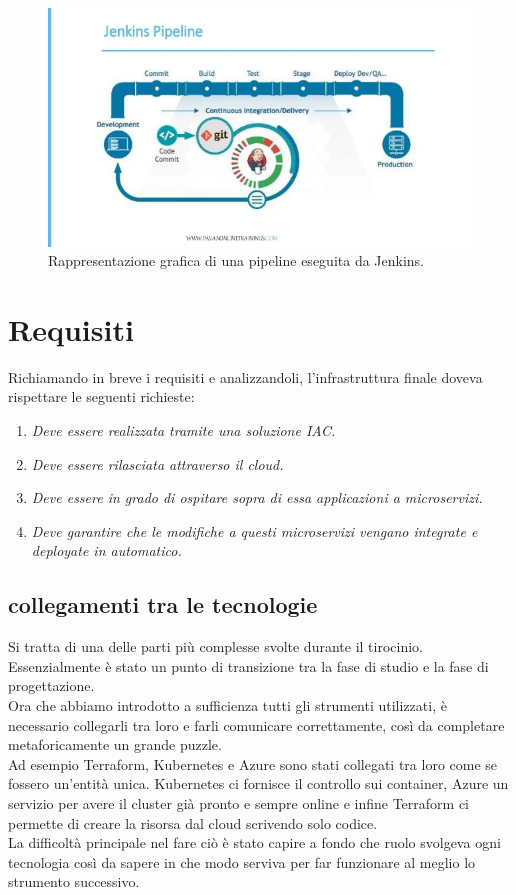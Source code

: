 \documentclass[a4paper,12pt]{report}
\begin{document}
\begin{figure}[h]
	\includegraphics[width=1.0\textwidth]{jenkins}
    \caption{Rappresentazione grafica di una pipeline eseguita da Jenkins. \cite{jenkinsimg}}
    \label{fig:jenkins}
\end{figure}

\section{Requisiti}
Richiamando in breve i requisiti e analizzandoli, l'infrastruttura finale doveva rispettare le seguenti richieste:\\
\begin{enumerate}
\item \textit{Deve essere realizzata tramite una soluzione IAC.}
\item \textit{Deve essere rilasciata attraverso il cloud.}
\item \textit{Deve essere in grado di ospitare sopra di essa applicazioni a microservizi.}
\item \textit{Deve garantire che le modifiche a questi microservizi vengano integrate e deployate in automatico. }
\end{enumerate}
\subsection{collegamenti tra le tecnologie}
Si tratta di una delle parti più complesse svolte durante il tirocinio. Essenzialmente è stato un punto di transizione tra la fase di studio e la fase di progettazione.\\
Ora che abbiamo introdotto a sufficienza tutti gli strumenti utilizzati, è necessario collegarli tra loro e farli comunicare correttamente, così da completare metaforicamente un grande puzzle.\\
Ad esempio Terraform, Kubernetes e Azure sono stati collegati tra loro come se fossero un'entità unica. Kubernetes ci fornisce il controllo sui container, Azure un servizio per avere il cluster già pronto e sempre online e infine Terraform ci permette di creare la risorsa dal cloud scrivendo solo codice. \\
La difficoltà principale nel fare ciò è stato capire a fondo che ruolo svolgeva ogni tecnologia così da sapere in che modo serviva per far funzionare al meglio lo strumento successivo.
\end{document}
